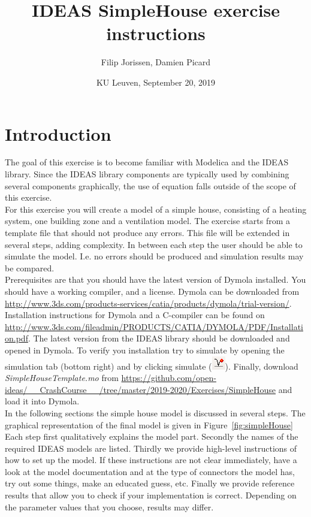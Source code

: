 \documentclass[10pt,a4paper]{article}
\begin{document}
\title{IDEAS SimpleHouse exercise instructions}
\author{Filip Jorissen, Damien Picard}
\date{KU Leuven, September 20, 2019}
\maketitle

\section*{Introduction}
The goal of this exercise is to become familiar with 
Modelica and the IDEAS library. 
Since the IDEAS library components are typically used
by combining several components graphically, the use of 
equation falls outside of the scope of this exercise.\\

For this exercise you will create a model of a simple house,
consisting of a heating system, one building zone 
and a ventilation model. 
The exercise starts from a template file that should 
not produce any errors. This file will be extended in
several steps, adding complexity.
In between each step the user should be able to simulate the
model. I.e. no errors should be produced and simulation results 
may be compared.\\

Prerequisites are that you should have the latest version of Dymola
installed. You should have a working compiler, and a license. 
Dymola can be downloaded from 
\url{http://www.3ds.com/products-services/catia/products/dymola/trial-version/}. 
Installation instructions for Dymola and a C-compiler can be found on 
\url{http://www.3ds.com/fileadmin/PRODUCTS/CATIA/DYMOLA/PDF/Installation.pdf}.
The latest version from the IDEAS library should be downloaded and opened in Dymola. 
To verify you installation try to simulate  by opening the simulation tab (bottom right) and by clicking simulate (\includegraphics[scale=0.5]{simulate.png}). Finally, download 
\textit{SimpleHouseTemplate.mo} from \url{https://github.com/open-ideas/__CrashCourse__/tree/master/2019-2020/Exercises/SimpleHouse}
and load it into Dymola.\\

In the following sections the simple house model is discussed 
in several steps. The graphical representation of the final model is 
given in Figure~\ref{fig:simpleHouse}
Each step first qualitatively explains the model part.
Secondly the names of the required IDEAS models 
are listed.
Thirdly we provide high-level instructions of how to
set up the model.
If these instructions are not clear immediately, 
have a look at the model documentation and at the type of
connectors the model has, 
try out some things, 
make an educated guess, etc.
Finally we provide reference results that allow you to check
if your implementation is correct. 
Depending on the parameter values that you choose, results
may differ.
 
\end{document}
